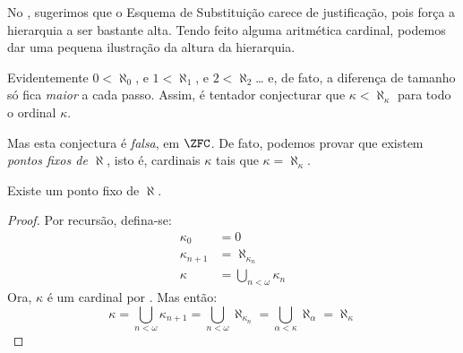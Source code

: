 \documentclass[../../../include/open-logic-section]{subfiles}
\begin{document}

No , sugerimos que o Esquema de Substituição carece de
justificação, pois força a hierarquia a ser bastante alta.
Tendo feito alguma aritmética cardinal, podemos dar uma pequena
ilustração da altura da hierarquia. 

Evidentemente $0 < \aleph_0$, e $1 < \aleph_1$, e $2 < \aleph_2$\ldots
e, de fato, a diferença de tamanho só fica \emph{maior} a cada
passo. Assim, é tentador conjecturar que $\kappa< \aleph_\kappa$
para todo o ordinal $\kappa$. 

Mas esta conjectura é \emph{falsa}, em $\ZFC$. De fato, podemos
provar que existem \emph{pontos fixos de $\aleph$}, isto é,
cardinais $\kappa$ tais que $\kappa=\aleph_\kappa$. 

\begin{prop}
Existe um ponto fixo de $\aleph$.
\end{prop}

\begin{proof}
Por recursão, defina-se:
\begin{align*}
	\kappa_0 &= 0\\
	\kappa_{n+1} &= \aleph_{\kappa_n}\\
	\kappa&= \bigcup_{n < \omega}\kappa_n
\end{align*}
Ora, $\kappa$ é um cardinal por
. Mas então:
\[
	\kappa= \bigcup_{n < \omega} \kappa_{n+1} = 
	\bigcup_{n < \omega}\aleph_{\kappa_n} = 
	\bigcup_{\alpha < \kappa}\aleph_\alpha = \aleph_\kappa
\]
\end{proof}
\end{document}
